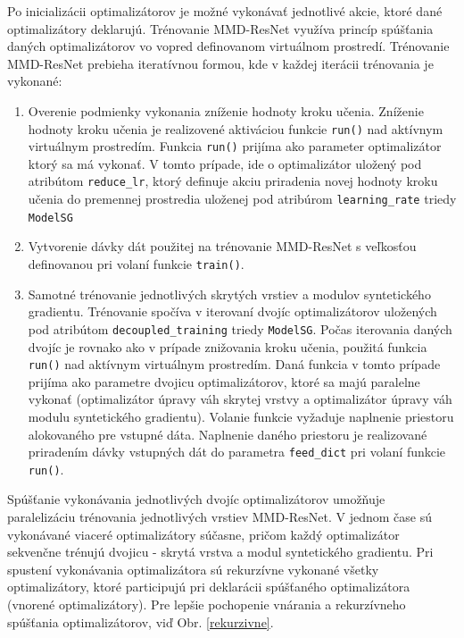 Po inicializácii optimalizátorov je možné vykonávať jednotlivé akcie, ktoré dané optimalizátory deklarujú. Trénovanie MMD-ResNet využíva princíp spúšťania daných optimalizátorov vo vopred definovanom virtuálnom prostredí. Trénovanie MMD-ResNet prebieha iteratívnou formou, kde v každej iterácii trénovania je vykonané:
\begin{enumerate}
    \item Overenie podmienky vykonania zníženie hodnoty kroku učenia. Zníženie hodnoty kroku učenia je realizovené aktiváciou funkcie \texttt{run()} nad aktívnym virtuálnym prostredím. Funkcia \texttt{run()} prijíma ako parameter optimalizátor ktorý sa má vykonať. V tomto prípade, ide o optimalizátor uložený pod atribútom \texttt{reduce_lr}, ktorý definuje akciu priradenia novej hodnoty kroku učenia do premennej prostredia uloženej pod atribúrom \texttt{learning_rate} triedy \texttt{ModelSG}
    \item Vytvorenie dávky dát použitej na trénovanie MMD-ResNet s veľkosťou definovanou pri volaní funkcie \texttt{train()}.
    \item Samotné trénovanie jednotlivých skrytých vrstiev a modulov syntetického gradientu. Trénovanie spočíva v iterovaní dvojíc optimalizátorov uložených pod atribútom \texttt{decoupled_training} triedy \texttt{ModelSG}. Počas iterovania daných dvojíc je rovnako ako v prípade znižovania kroku učenia, použitá funkcia \texttt{run()} nad aktívnym virtuálnym prostredím. Daná funkcia v tomto prípade prijíma ako parametre dvojicu optimalizátorov, ktoré sa majú paralelne vykonať (optimalizátor úpravy váh skrytej vrstvy a optimalizátor úpravy váh modulu syntetického gradientu). Volanie funkcie vyžaduje naplnenie priestoru alokovaného pre vstupné dáta. Naplnenie daného priestoru je realizované priradením dávky vstupných dát do parametra \texttt{feed_dict} pri volaní funkcie \texttt{run()}.
\end{enumerate}

Spúšťanie vykonávania jednotlivých dvojíc optimalizátorov umožňuje paralelizáciu trénovania jednotlivých vrstiev MMD-ResNet. V jednom čase sú vykonávané viaceré optimalizátory súčasne, pričom každý optimalizátor sekvenčne trénujú dvojicu - skrytá vrstva a modul syntetického gradientu. Pri spustení vykonávania optimalizátora sú rekurzívne vykonané všetky optimalizátory, ktoré participujú pri deklarácii spúšťaného optimalizátora (vnorené optimalizátory). Pre lepšie pochopenie vnárania a rekurzívneho spúšťania optimalizátorov, viď Obr. \ref{rekurzivne}.

